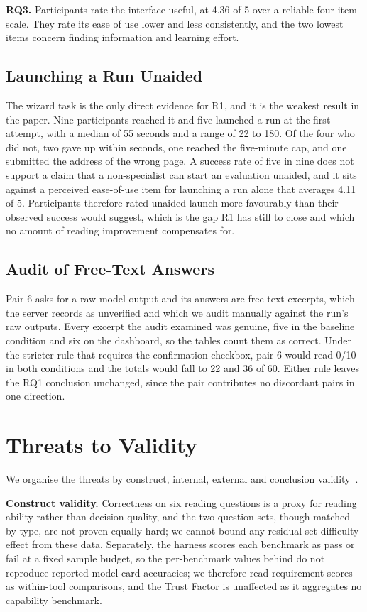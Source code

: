 \documentclass[10pt,conference,a4paper]{IEEEtran}
\providecommand{\rqbox}[2]{%
  \begin{tcolorbox}[
    colback=green!10,
    colframe=rqgreen,
    arc=1mm,
    boxrule=0.5pt,
    left=1mm,
    right=1mm,
    top=0.5mm,
    bottom=0.5mm,
    before skip=4pt,
    after skip=4pt
  ]
  \textbf{#1.} #2
  \end{tcolorbox}%
}
\begin{document}
\rqbox{RQ3}{Participants rate the interface useful, at 4.36 of 5 over a reliable four-item scale. They rate its ease of use lower and less consistently, and the two lowest items concern finding information and learning effort.}

\subsection{Launching a Run Unaided}
The wizard task is the only direct evidence for R1, and it is the weakest result in the paper.
Nine participants reached it and five launched a run at the first attempt, with a median of 55 seconds and a range of 22 to 180.
Of the four who did not, two gave up within seconds, one reached the five-minute cap, and one submitted the address of the wrong page.
A success rate of five in nine does not support a claim that a non-specialist can start an evaluation unaided, and it sits against a perceived ease-of-use item for launching a run alone that averages 4.11 of 5.
Participants therefore rated unaided launch more favourably than their observed success would suggest, which is the gap R1 has still to close and which no amount of reading improvement compensates for.

\subsection{Audit of Free-Text Answers}
Pair 6 asks for a raw model output and its answers are free-text excerpts, which the server records as unverified and which we audit manually against the run's raw outputs.
Every excerpt the audit examined was genuine, five in the baseline condition and six on the dashboard, so the tables count them as correct.
Under the stricter rule that requires the confirmation checkbox, pair 6 would read 0/10 in both conditions and the totals would fall to 22 and 36 of 60.
Either rule leaves the RQ1 conclusion unchanged, since the pair contributes no discordant pairs in one direction.

\section{Threats to Validity}
\label{sec:threats}
We organise the threats by construct, internal, external and conclusion validity~\cite{wohlin2012experimentation}.

\textbf{Construct validity.}
Correctness on six reading questions is a proxy for reading ability rather than decision quality, and the two question sets, though matched by type, are not proven equally hard; we cannot bound any residual set-difficulty effect from these data. Separately, the harness scores each benchmark as pass or fail at a fixed sample budget, so the per-benchmark values behind  do not reproduce reported model-card accuracies; we therefore read requirement scores as within-tool comparisons, and the Trust Factor is unaffected as it aggregates no capability benchmark.
\end{document}

